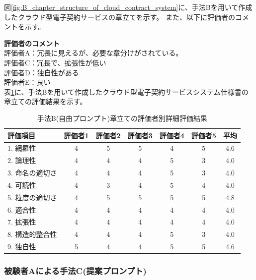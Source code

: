 図\ref{fig:B_chapter_structure_of_cloud_contract_system}に、手法Bを用いて作成したクラウド型電子契約サービスの章立てを示す。
また、以下に評価者のコメントを示す。

\noindent\textbf{評価者のコメント}\\
評価者A：冗長に見えるが、必要な章分けがされている。\\
評価者C：冗長で、拡張性が低い\\
評価者D：独自性がある\\
評価者E：良い\\

表\ref{tb:cloud_detailed_evaluation_results_B}に、手法Bを用いて作成したクラウド型電子契約サービスシステム仕様書の章立ての評価結果を示す。

\begin{table}[tp]
  \caption{手法B(自由プロンプト)章立ての評価者別詳細評価結果}
  \label{tb:cloud_detailed_evaluation_results_B}
  \centering
  \begin{tabular}{|l|c|c|c|c|c|c|}
    \hline
    \textbf{評価項目} & \textbf{評価者1} & \textbf{評価者2} & \textbf{評価者3} & \textbf{評価者4} & \textbf{評価者5} & \textbf{平均} \\
    \hline\hline
    1. 網羅性 & 4 & 5 & 5 & 4 & 5 & 4.6 \\
    \hline
    2. 論理性 & 4 & 4 & 4 & 5 & 3 & 4.0 \\
    \hline
    3. 命名の適切さ & 4 & 4 & 4 & 5 & 3 & 4.0 \\
    \hline
    4. 可読性 & 4 & 3 & 4 & 5 & 4 & 4.0 \\
    \hline
    5. 粒度の適切さ & 4 & 5 & 5 & 5 & 5 & 4.8 \\
    \hline
    6. 適合性 & 4 & 4 & 4 & 4 & 4 & 4.0 \\
    \hline
    7. 拡張性 & 4 & 4 & 4 & 4 & 4 & 4.0 \\
    \hline
    8. 構造的整合性 & 4 & 4 & 4 & 5 & 3 & 4.0 \\
    \hline
    9. 独自性 & 5 & 4 & 4 & 5 & 5 & 4.6 \\
    \hline
  \end{tabular}
\end{table}





\subsubsection{被験者Aによる手法C(提案プロンプト)}

